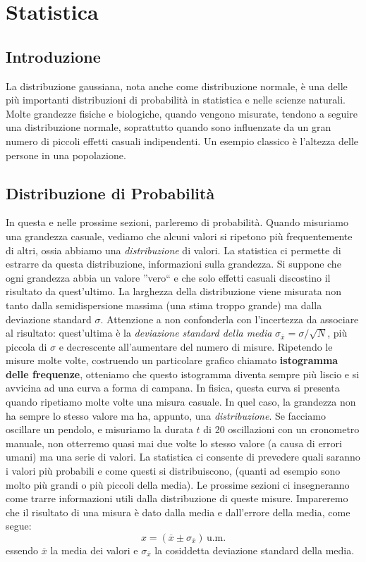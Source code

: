 \chapter{Statistica}
\section{Introduzione}
La distribuzione gaussiana, nota anche come distribuzione normale, è una delle più importanti distribuzioni di probabilità in statistica e nelle scienze naturali. Molte grandezze fisiche e biologiche, quando vengono misurate, tendono a seguire una distribuzione normale, soprattutto quando sono influenzate da un gran numero di piccoli effetti casuali indipendenti. Un esempio classico è l'altezza delle persone in una popolazione.

\section{Distribuzione di Probabilità}
In questa e nelle prossime sezioni, parleremo di probabilità. Quando misuriamo una grandezza casuale, vediamo che alcuni valori si ripetono più frequentemente di altri, ossia abbiamo una \textit{distribuzione} di valori. La statistica ci permette di estrarre da questa distribuzione, informazioni sulla grandezza. Si suppone che ogni grandezza abbia un valore ''vero`` e che solo effetti casuali discostino il risultato da quest'ultimo. La larghezza della distribuzione viene misurata non tanto dalla semidispersione massima (una stima troppo grande) ma dalla deviazione standard $\sigma$. Attenzione a non confonderla con l'incertezza da associare al risultato: quest'ultima è la \textit{deviazione standard della media} $\sigma_{\overline{x}} = \sigma/\sqrt{N}$, più piccola di $\sigma$ e decrescente all'aumentare del numero di misure. Ripetendo le misure molte volte, costruendo un  particolare grafico chiamato \textbf{istogramma delle frequenze}, otteniamo che questo istogramma diventa sempre  più liscio e  si avvicina ad una curva a forma di campana. In fisica, questa curva si presenta quando ripetiamo molte volte una misura casuale. In quel caso, la grandezza non ha sempre lo stesso valore ma ha, appunto, una \textit{distribuzione}. Se facciamo oscillare un pendolo, e misuriamo la durata $t$ di 20 oscillazioni con un cronometro manuale, non otterremo quasi mai due volte lo stesso valore (a causa di errori umani) ma una serie di valori. La statistica ci consente di prevedere quali saranno i valori più probabili e come questi si distribuiscono, (quanti ad esempio sono molto più grandi o più piccoli della media). Le prossime sezioni ci insegneranno come trarre informazioni utili dalla distribuzione di queste misure. Impareremo che il risultato di una misura è dato dalla media e dall'errore della media, come segue:
\[
x=\left(\overline{x} \pm \sigma_{\overline{x}}\right) \, \text{u.m.}
\]
essendo $\overline{x}$ la media dei valori e $\sigma_{\overline{x}}$ la cosiddetta deviazione standard della media.

